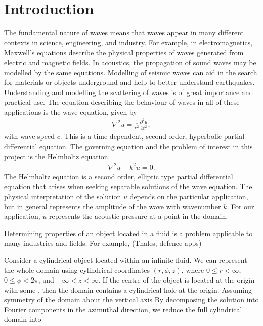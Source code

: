 \chapter{Introduction}

The fundamental nature of waves means that waves appear in many different contexts in science, engineering, and industry.
For example, in electromagnetics, Maxwell's equations describe the physical properties of waves generated from electric and magnetic fields.
In acoustics, the propagation of sound waves may be modelled by the same equations.
Modelling of seismic waves can aid in the search for materials or objects underground and help to better understand earthquakes.
Understanding and modelling the scattering of waves is of great importance and practical use.
The equation describing the behaviour of waves in all of these applications is the wave equation, given by
\begin{align}
	\nabla^2 u = \frac{1}{c^2}\frac{\partial^2 u}{\partial t^2}, \label{eqn:first}
\end{align}
with wave speed $c$.
This is a time-dependent, second order, hyperbolic partial differential equation.
The governing equation and the problem of interest in this project is the Helmholtz equation.
\begin{align}
	\nabla^2 u + k^2 u = 0.
\end{align}
The Helmholtz equation is a second order, elliptic type partial differential equation that arises when seeking separable solutions of the wave equation.
The physical interpretation of the solution $u$ depends on the particular application, but in general represents the amplitude of the wave with wavenumber $k$.
For our application, $u$ represents the acoustic pressure at a point in the domain.

Determining properties of an object located in a fluid is a problem applicable to many industries and fields.
For example, (Thales, defence apps)

Consider a cylindrical object located within an infinite fluid.
We can represent the whole domain using cylindrical coordinates $(r, \phi, z)$, where $0\leq r < \infty$, $0 \leq \phi < 2\pi$, and $-\infty < z < \infty$.
If the centre of the object is located at the origin with some , then the domain contains a cylindrical hole at the origin.
Assuming symmetry of the domain about the vertical axis
By decomposing the solution into Fourier components in the azimuthal direction, we reduce the full cylindrical domain into 


